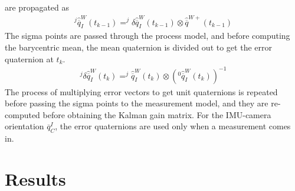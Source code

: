 \documentclass[letterpaper]{article}
\begin{document}
are propagated as
\begin{align}
^j \hat{\overline{q}}_I^W(t_{k-1})=^j \delta \hat{\overline{q}}_I^W(t_{k-1}) \otimes \hat{\overline{q}}^{W+} (t_{k-1})
\end{align}
The sigma points are passed through the process model, and before
computing the barycentric mean, the mean quaternion is divided out to
get the error quaternion at $t_k$.
\begin{align}
^j \delta \hat{\overline{q}}_I^W(t_k)=^j \hat{\overline{q}}_I^W(t_k) \otimes \left( ^0 \hat{\overline{q}}_I^W(t_k)\right)^{-1}
\end{align}
The process of multiplying error vectors to get unit quaternions is
repeated before passing the sigma points to the measurement model, and
they are re-computed before obtaining the Kalman gain matrix. For the
IMU-camera orientation $\overline{q}_C^I$, the error quaternions are
used only when a measurement comes in.

\section{Results}





\end{document}
